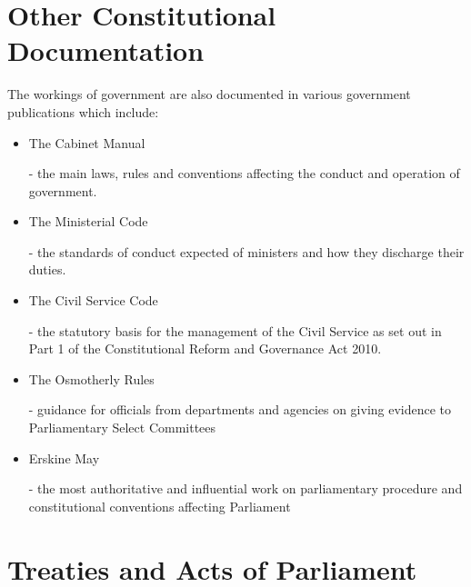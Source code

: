 \documentclass[14pt,titlepage]{extarticle}
\begin{document}
\section{Other Constitutional Documentation}

The workings of government are also documented in various government publications which include:

\begin{itemize}
\item The Cabinet Manual \cite{rbjw005}
  
  - the main laws, rules and conventions affecting the conduct and operation of government.

\item The Ministerial Code \cite{rbjw006}

  - the standards of conduct expected of ministers and how they discharge their duties.
  
\item The Civil Service Code \cite{rbjw007}

  - the statutory basis for the management of the Civil Service as set out in Part 1 of the Constitutional Reform and Governance Act 2010.

\item The Osmotherly Rules \cite{rbjw008}
  
  - guidance for officials from departments and agencies on giving evidence to Parliamentary Select Committees
\item Erskine May \cite{rbjw009,rbjw010}

  - the most authoritative and influential work on parliamentary procedure and constitutional conventions affecting Parliament
\end{itemize}

\pagebreak
\section{Treaties and Acts of Parliament}\label{ActList}
\end{document}
